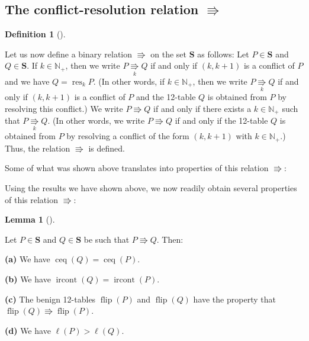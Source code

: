 \documentclass[numbers=enddot,12pt,final,onecolumn,notitlepage]{scrartcl}%
\theoremstyle{definition}
\newtheorem{lem}[theo]{Lemma}
\newenvironment{lemma}[1][]
{\begin{lem}[#1]\begin{leftbar}}
{\end{leftbar}\end{lem}}
\newtheorem{defi}[theo]{Definition}
\newenvironment{definition}[1][]
{\begin{defi}[#1]\begin{leftbar}}
{\end{leftbar}\end{defi}}
\newenvironment{verlong}{}{}
\newenvironment{vershort}{}{}
\begin{document}
\subsection{The conflict-resolution relation $\Rrightarrow$}

\begin{definition}
Let us now define a binary relation $\Rrightarrow$ on the set $\mathbf{S}$ as
follows: Let $P\in\mathbf{S}$ and $Q\in\mathbf{S}$. If $k\in\mathbb{N}_{+}$,
then we write $P\underset{k}{\Rrightarrow}Q$ if and only if $\left(
k,k+1\right)  $ is a conflict of $P$ and we have $Q=\operatorname*{res}%
\nolimits_{k}P$. (In other words, if $k\in\mathbb{N}_{+}$, then we write
$P\underset{k}{\Rrightarrow}Q$ if and only if $\left(  k,k+1\right)  $ is a
conflict of $P$ and the 12-table $Q$ is obtained from $P$ by resolving this
conflict.) We write $P\Rrightarrow Q$ if and only if there exists a
$k\in\mathbb{N}_{+}$ such that $P\underset{k}{\Rrightarrow}Q$. (In other
words, we write $P\Rrightarrow Q$ if and only if the 12-table $Q$ is obtained
from $P$ by resolving a conflict of the form $\left(  k,k+1\right)  $ with
$k\in\mathbb{N}_{+}$.) Thus, the relation $\Rrightarrow$ is defined.
\end{definition}

\begin{vershort}
Some of what was shown above translates into properties of this relation
$\Rrightarrow$:
\end{vershort}

\begin{verlong}
Using the results we have shown above, we now readily obtain several
properties of this relation $\Rrightarrow$:
\end{verlong}

\begin{lemma}
\label{lem.conflict-resolution-props}Let $P\in\mathbf{S}$ and $Q\in\mathbf{S}$
be such that $P\Rrightarrow Q$. Then:

\textbf{(a)} We have $\operatorname*{ceq}\left(  Q\right)
=\operatorname*{ceq}\left(  P\right)  $.

\textbf{(b)} We have $\operatorname*{ircont}\left(  Q\right)
=\operatorname*{ircont}\left(  P\right)  $.

\textbf{(c)} The benign 12-tables $\operatorname*{flip}\left(  P\right)  $ and
$\operatorname*{flip}\left(  Q\right)  $ have the property that
$\operatorname*{flip}\left(  Q\right)  \Rrightarrow\operatorname*{flip}\left(
P\right)  $.

\textbf{(d)} We have $\ell\left(  P\right)  >\ell\left(  Q\right)  $.
\end{lemma}
\end{document}
